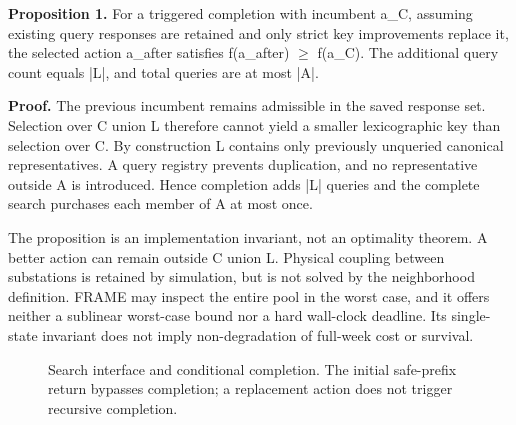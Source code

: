 \textbf{Proposition 1.} For a triggered completion with incumbent a\_C, assuming existing query responses are retained and only strict key improvements replace it, the selected action a\_after satisfies f(a\_after) $\geq$ f(a\_C). The additional query count equals |L|, and total queries are at most |A|.


\textbf{Proof.} The previous incumbent remains admissible in the saved response set. Selection over C union L therefore cannot yield a smaller lexicographic key than selection over C. By construction L contains only previously unqueried canonical representatives. A query registry prevents duplication, and no representative outside A is introduced. Hence completion adds |L| queries and the complete search purchases each member of A at most once.


The proposition is an implementation invariant, not an optimality theorem. A better action can remain outside C union L. Physical coupling between substations is retained by simulation, but is not solved by the neighborhood definition. FRAME may inspect the entire pool in the worst case, and it offers neither a sublinear worst-case bound nor a hard wall-clock deadline. Its single-state invariant does not imply non-degradation of full-week cost or survival.


\begin{figure}[t]
\centering
{}
\caption{Search interface and conditional completion. The initial safe-prefix return bypasses completion; a replacement action does not trigger recursive completion.}
\label{fig:framework}
\end{figure}

